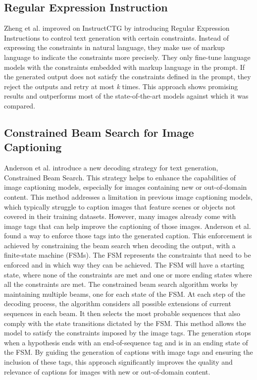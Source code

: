 \subsection{Regular Expression Instruction}
Zheng et al. \cite{zheng_toward_2023} improved on InstructCTG by introducing Regular Expression Instructions to control text generation with certain constraints.  Instead of expressing the constraints in natural language, they make use of markup language to indicate the constraints more precisely. They only fine-tune language models with the constraints embedded with markup language in the prompt. If the generated output does not satisfy the constraints defined in the prompt, they reject the outputs and retry at most \textit{k} times. This approach shows promising results and outperforms most of the state-of-the-art models against which it was compared.

\subsection{Constrained Beam Search for Image Captioning}
Anderson et al. \cite{anderson_guided_2017} introduce a new decoding strategy for text generation, Constrained Beam Search. This strategy helps to enhance the capabilities of image captioning models, especially for images containing new or out-of-domain content. This method addresses a limitation in previous image captioning models, which typically struggle to caption images that feature scenes or objects not covered in their training datasets. However, many images already come with image tags that can help improve the captioning of those images. Anderson et al. found a way to enforce those tags into the generated caption. This enforcement is achieved by constraining the beam search when decoding the output, with a finite-state machine (FSMs). The FSM represents the constraints that need to be enforced and in which way they can be achieved. The FSM will have a starting state, where none of the constraints are met and one or more ending states where all the constraints are met. The constrained beam search algorithm works by maintaining multiple beams, one for each state of the FSM. At each step of the decoding process, the algorithm considers all possible extensions of current sequences in each beam. It then selects the most probable sequences that also comply with the state transitions dictated by the FSM. This method allows the model to satisfy the constraints imposed by the image tags. The generation stops when a hypothesis ends with an end-of-sequence tag and is in an ending state of the FSM. By guiding the generation of captions with image tags and ensuring the inclusion of these tags, this approach significantly improves the quality and relevance of captions for images with new or out-of-domain content.

